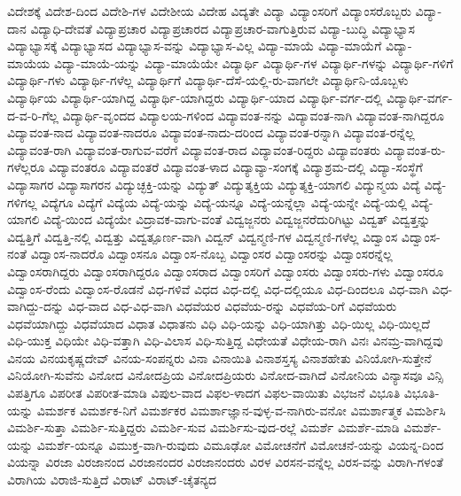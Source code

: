 {ವಿದೇಶಕ್ಕೆ
ವಿದೇಶ-ದಿಂದ
ವಿದೇಶಿ-ಗಳ
ವಿದೇಶೀಯ
ವಿದೇಹ
ವಿದ್ಯತೇ
ವಿದ್ಯಾ
ವಿದ್ಯಾಂಸರಿಗೆ
ವಿದ್ಯಾಂಸರೊಬ್ಬರು
ವಿದ್ಯಾ-ದಾನ
ವಿದ್ಯಾಧಿ-ದೇವತೆ
ವಿದ್ಯಾಪ್ರಚಾರ
ವಿದ್ಯಾಪ್ರಚಾರದ
ವಿದ್ಯಾಪ್ರಚಾರ-ವಾಗುತ್ತಿರುವ
ವಿದ್ಯಾ-ಬುದ್ಧಿ
ವಿದ್ಯಾಭ್ಯಾಸ
ವಿದ್ಯಾಭ್ಯಾಸಕ್ಕೆ
ವಿದ್ಯಾಭ್ಯಾಸದ
ವಿದ್ಯಾಭ್ಯಾಸ-ವನ್ನು
ವಿದ್ಯಾಭ್ಯಾಸ-ವಿಲ್ಲ
ವಿದ್ಯಾ-ಮಾಯೆ
ವಿದ್ಯಾ-ಮಾಯೆಗೆ
ವಿದ್ಯಾ-ಮಾಯೆಯ
ವಿದ್ಯಾ-ಮಾಯೆ-ಯನ್ನು
ವಿದ್ಯಾ-ಮಾಯೆಯೇ
ವಿದ್ಯಾರ್ಥಿ
ವಿದ್ಯಾರ್ಥಿ-ಗಳ
ವಿದ್ಯಾರ್ಥಿ-ಗಳನ್ನು
ವಿದ್ಯಾರ್ಥಿ-ಗಳಿಗೆ
ವಿದ್ಯಾರ್ಥಿ-ಗಳು
ವಿದ್ಯಾರ್ಥಿ-ಗಳೆಲ್ಲ
ವಿದ್ಯಾರ್ಥಿಗೆ
ವಿದ್ಯಾರ್ಥಿ-ದೆಸೆ-ಯಲ್ಲಿ-ರು-ವಾಗಲೇ
ವಿದ್ಯಾರ್ಥಿನಿ-ಯೊಬ್ಬಳು
ವಿದ್ಯಾರ್ಥಿಯ
ವಿದ್ಯಾರ್ಥಿ-ಯಾಗಿದ್ದ
ವಿದ್ಯಾರ್ಥಿ-ಯಾಗಿದ್ದರು
ವಿದ್ಯಾರ್ಥಿ-ಯಾದ
ವಿದ್ಯಾರ್ಥಿ-ವರ್ಗ-ದಲ್ಲಿ
ವಿದ್ಯಾರ್ಥಿ-ವರ್ಗ-ದ-ವ-ರಿ-ಗೆಲ್ಲ
ವಿದ್ಯಾರ್ಥಿ-ವೃಂದದ
ವಿದ್ಯಾಲಯ-ಗಳಿಂದ
ವಿದ್ಯಾವಂತ-ನನ್ನು
ವಿದ್ಯಾವಂತ-ನಾಗಿ
ವಿದ್ಯಾವಂತ-ನಾಗಿದ್ದರೂ
ವಿದ್ಯಾವಂತ-ನಾದ
ವಿದ್ಯಾವಂತ-ನಾದರೂ
ವಿದ್ಯಾವಂತ-ನಾದು-ದರಿಂದ
ವಿದ್ಯಾವಂತ-ರನ್ನಾಗಿ
ವಿದ್ಯಾವಂತ-ರನ್ನೆಲ್ಲ
ವಿದ್ಯಾವಂತ-ರಾಗಿ
ವಿದ್ಯಾವಂತ-ರಾಗುವ-ವರೆಗೆ
ವಿದ್ಯಾವಂತ-ರಾದ
ವಿದ್ಯಾವಂತ-ರಿದ್ದರು
ವಿದ್ಯಾವಂತರು
ವಿದ್ಯಾವಂತ-ರು-ಗಳೆಲ್ಲರೂ
ವಿದ್ಯಾವಂತರೂ
ವಿದ್ಯಾವಂತರೆ
ವಿದ್ಯಾವಂತ-ಳಾದ
ವಿದ್ಯಾವ್ಯಾ-ಸಂಗಕ್ಕೆ
ವಿದ್ಯಾಶ್ರಮ-ದಲ್ಲಿ
ವಿದ್ಯಾ-ಸಂಸ್ಥೆಗೆ
ವಿದ್ಯಾಸಾಗರ
ವಿದ್ಯಾಸಾಗರನ
ವಿದ್ಯುಚ್ಛಕ್ತಿ-ಯನ್ನು
ವಿದ್ಯುತ್
ವಿದ್ಯುತ್ಶಕ್ತಿಯ
ವಿದ್ಯುತ್ಶಕ್ತಿ-ಯಾಗಲಿ
ವಿದ್ಯುನ್ಮಯ
ವಿದ್ಯೆ
ವಿದ್ಯೆ-ಗಳಿಗಲ್ಲ
ವಿದ್ಯೆಗೂ
ವಿದ್ಯೆಗೆ
ವಿದ್ಯೆಯ
ವಿದ್ಯೆ-ಯನ್ನು
ವಿದ್ಯೆ-ಯನ್ನೂ
ವಿದ್ಯೆ-ಯನ್ನೆಲ್ಲಾ
ವಿದ್ಯೆ-ಯನ್ನೇ
ವಿದ್ಯೆ-ಯಲ್ಲಿ
ವಿದ್ಯೆ-ಯಾಗಲಿ
ವಿದ್ಯೆ-ಯಿಂದ
ವಿದ್ಯೆಯೇ
ವಿದ್ರಾವಕ-ವಾಗು-ವಂತೆ
ವಿದ್ವಜ್ಜನರು
ವಿದ್ವಜ್ಜನರೆದುರಿಗಿಟ್ಟು
ವಿದ್ವತ್
ವಿದ್ವತ್ತನ್ನು
ವಿದ್ವತ್ತಿಗೆ
ವಿದ್ವತ್ತಿ-ನಲ್ಲಿ
ವಿದ್ವತ್ತು
ವಿದ್ವತ್ಪೂರ್ಣ-ವಾಗಿ
ವಿದ್ವನ್
ವಿದ್ವನ್ಮಣಿ-ಗಳ
ವಿದ್ವನ್ಮಣಿ-ಗಳೆಲ್ಲ
ವಿದ್ವಾಂಸ
ವಿದ್ವಾಂಸ-ನಂತೆ
ವಿದ್ವಾಂಸ-ನಾದರೊ
ವಿದ್ವಾಂಸನೂ
ವಿದ್ವಾಂಸ-ನೊಬ್ಬ
ವಿದ್ವಾಂಸರ
ವಿದ್ವಾಂಸರನ್ನು
ವಿದ್ವಾಂಸರನ್ನೆಲ್ಲ
ವಿದ್ವಾಂಸರಾಗಿದ್ದರು
ವಿದ್ವಾಂಸರಾಗಿದ್ದರೂ
ವಿದ್ವಾಂಸರಾದ
ವಿದ್ವಾಂಸರಿಗೆ
ವಿದ್ವಾಂಸರು
ವಿದ್ವಾಂಸರು-ಗಳು
ವಿದ್ವಾಂಸರೂ
ವಿದ್ವಾಂಸ-ರೆಂದು
ವಿದ್ವಾಂಸ-ರೊಡನೆ
ವಿಧ-ಗಳಿವೆ
ವಿಧದ
ವಿಧ-ದಲ್ಲಿ
ವಿಧ-ದಲ್ಲಿಯೂ
ವಿಧ-ದಿಂದಲೂ
ವಿಧ-ವಾಗಿ
ವಿಧ-ವಾಗಿದ್ದು-ದನ್ನು
ವಿಧ-ವಾದ
ವಿಧ-ವಿಧ-ವಾಗಿ
ವಿಧವೆಯರ
ವಿಧವೆಯ-ರನ್ನು
ವಿಧವೆಯ-ರಿಗೆ
ವಿಧವೆಯರು
ವಿಧವೆಯಾಗಿದ್ದು
ವಿಧವೆಯಾದ
ವಿಧಾತ
ವಿಧಾತನು
ವಿಧಿ
ವಿಧಿ-ಯನ್ನು
ವಿಧಿ-ಯಾಗಿತ್ತು
ವಿಧಿ-ಯಿಲ್ಲ
ವಿಧಿ-ಯಿಲ್ಲದೆ
ವಿಧಿ-ಯುಕ್ತ
ವಿಧಿಯೇ
ವಿಧಿ-ವತ್ತಾಗಿ
ವಿಧಿ-ವಿಲಾಸ
ವಿಧಿ-ಸುತ್ತಿದ್ದ
ವಿಧೇಯತೆ
ವಿಧೇಯ-ರಾಗಿ
ವಿನಃ
ವಿನಮ್ರ-ವಾಗಿದ್ದವು
ವಿನಯ
ವಿನಯಕೃಷ್ಣದೇವ್
ವಿನಯ-ಸಂಪನ್ನರು
ವಿನಾ
ವಿನಾಯಿತಿ
ವಿನಾಶಸ್ತಸ್ಯ
ವಿನಾಶಹೇತು
ವಿನಿಯೋಗಿ-ಸುತ್ತೇನೆ
ವಿನಿಯೋಗಿ-ಸುವೆನು
ವಿನೋದ
ವಿನೋದಪ್ರಿಯ
ವಿನೋದಪ್ರಿಯರು
ವಿನೋದ-ವಾಗಿದೆ
ವಿನೋನಿಯ
ವಿನ್ಯಾಸವೂ
ವಿನ್ಸಿ
ವಿಪತ್ತಿಗೂ
ವಿಪರೀತ
ವಿಪರೀತ-ಮಾಡಿ
ವಿಪುಲ-ವಾದ
ವಿಫಲ-ಳಾದಗ
ವಿಫಲ-ವಾಯಿತು
ವಿಭಜನೆ
ವಿಭೂತಿ
ವಿಭೂತಿ-ಯನ್ನು
ವಿಮರ್ಶಕ
ವಿಮರ್ಶಕ-ನಿಗೆ
ವಿಮರ್ಶಕರ
ವಿಮರ್ಶಾಜ್ಞಾನ-ವುಳ್ಳ-ವ-ನಾಗಿರು-ವನೋ
ವಿಮರ್ಶಾತ್ಮಕ
ವಿಮರ್ಶಿಸಿ
ವಿಮರ್ಶಿ-ಸುತ್ತಾ
ವಿಮರ್ಶಿ-ಸುತ್ತಿದ್ದರು
ವಿಮರ್ಶಿ-ಸುವ
ವಿಮರ್ಶಿಸು-ವುದ-ರಲ್ಲೆ
ವಿಮರ್ಶೆ
ವಿಮರ್ಶೆ-ಮಾಡಿ
ವಿಮರ್ಶೆ-ಯನ್ನು
ವಿಮರ್ಶೆ-ಯನ್ನೂ
ವಿಮುಕ್ತ-ವಾಗಿ-ರುವುದು
ವಿಮೂಢೋ
ವಿಮೋಚನೆಗೆ
ವಿಮೋಚನೆ-ಯನ್ನು
ವಿಯನ್ನ-ದಿಂದ
ವಿಯನ್ನಾ
ವಿರಜಾ
ವಿರಜಾನಂದ
ವಿರಜಾನಂದರ
ವಿರಜಾನಂದರು
ವಿರಳ
ವಿರಸನ-ವನ್ನೆಲ್ಲ
ವಿರಸ-ವನ್ನು
ವಿರಾಗಿ-ಗಳಂತೆ
ವಿರಾಗಿಯ
ವಿರಾಜಿ-ಸುತ್ತಿದೆ
ವಿರಾಟ್
ವಿರಾಟ್-ಚೈತನ್ಯದ
}
